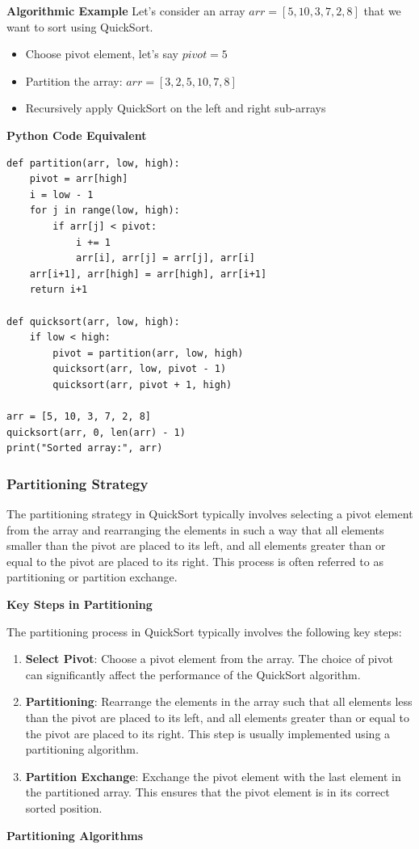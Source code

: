 \documentclass[12pt]{book} %
\begin{document}
\textbf{Algorithmic Example}
Let's consider an array $arr = [5, 10, 3, 7, 2, 8]$ that we want to sort using QuickSort.
\FloatBarrier
\begin{itemize}
\item Choose pivot element, let's say $pivot = 5$
\item Partition the array: $arr = [3, 2, 5, 10, 7, 8]$
\item Recursively apply QuickSort on the left and right sub-arrays
\end{itemize}
\FloatBarrier
\textbf{Python Code Equivalent}
\FloatBarrier
\begin{lstlisting}
def partition(arr, low, high):
    pivot = arr[high]
    i = low - 1
    for j in range(low, high):
        if arr[j] < pivot:
            i += 1
            arr[i], arr[j] = arr[j], arr[i]
    arr[i+1], arr[high] = arr[high], arr[i+1]
    return i+1

def quicksort(arr, low, high):
    if low < high:
        pivot = partition(arr, low, high)
        quicksort(arr, low, pivot - 1)
        quicksort(arr, pivot + 1, high)

arr = [5, 10, 3, 7, 2, 8]
quicksort(arr, 0, len(arr) - 1)
print("Sorted array:", arr)
\end{lstlisting}
\FloatBarrier

\subsubsection{Partitioning Strategy}
The partitioning strategy in QuickSort typically involves selecting a pivot element from the array and rearranging the elements in such a way that all elements smaller than the pivot are placed to its left, and all elements greater than or equal to the pivot are placed to its right. This process is often referred to as partitioning or partition exchange.

\textbf{Key Steps in Partitioning}

The partitioning process in QuickSort typically involves the following key steps:
\FloatBarrier
\begin{enumerate}
    \item \textbf{Select Pivot}: Choose a pivot element from the array. The choice of pivot can significantly affect the performance of the QuickSort algorithm.
    \item \textbf{Partitioning}: Rearrange the elements in the array such that all elements less than the pivot are placed to its left, and all elements greater than or equal to the pivot are placed to its right. This step is usually implemented using a partitioning algorithm.
    \item \textbf{Partition Exchange}: Exchange the pivot element with the last element in the partitioned array. This ensures that the pivot element is in its correct sorted position.
\end{enumerate}
\FloatBarrier
\textbf{Partitioning Algorithms}
\end{document}
